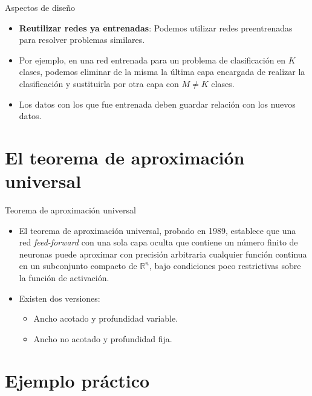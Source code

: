 \documentclass[spanish]{beamer}
\begin{document}
\begin{frame}{Aspectos de diseño}
  \begin{itemize}
    \item \textbf{Reutilizar redes ya entrenadas}: Podemos utilizar redes preentrenadas para resolver problemas similares.

    \item Por ejemplo, en una red entrenada para un problema de clasificación en $K$ clases, podemos eliminar de la misma la última capa encargada de realizar la clasificación y sustituirla por otra capa con $M \neq K$ clases.

    \item Los datos con los que fue entrenada deben guardar relación con los nuevos datos.
  \end{itemize}

\end{frame}

\section{El teorema de aproximación universal}

\begin{frame}{Teorema de aproximación universal}
  \begin{itemize}
\item El teorema de aproximación universal, probado en 1989, establece que una red \textit{feed-forward} con una sola capa oculta que contiene un número finito de neuronas puede aproximar con precisión arbitraria cualquier función continua en un subconjunto compacto de $\mathbb{R}^n$, bajo condiciones poco restrictivas sobre la función de activación.
\item Existen dos versiones:
\begin{itemize}
  \item Ancho acotado y profundidad variable.
  \item Ancho no acotado y profundidad fija.
\end{itemize}
  \end{itemize}

\end{frame}

\section{Ejemplo práctico}
\end{document}
